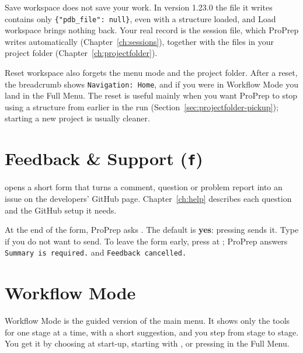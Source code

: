 \begin{watchout}
\textsf{Save workspace} does not save your work. In version 1.23.0 the file it
writes contains only \texttt{\{"pdb\_file": null\}}, even with a structure
loaded, and \textsf{Load workspace} brings nothing back. Your real record is the
session file, which ProPrep writes automatically (Chapter~\ref{ch:sessions}),
together with the files in your project folder (Chapter~\ref{ch:projectfolder}).
\end{watchout}

\begin{watchout}
\textsf{Reset workspace} also forgets the menu mode and the project folder. After
a reset, the breadcrumb shows \texttt{Navigation: Home}, and if you were in
Workflow Mode you land in the Full Menu. The reset is useful mainly when you want
ProPrep to stop using a structure from earlier in the run
(Section~\ref{sec:projectfolder-pickup}); starting a new project is usually
cleaner.
\end{watchout}

\section{Feedback \& Support (\texttt{f})}\label{sec:menus-feedback}

 opens a short form that turns a comment, question or problem report into
an issue on the developers' GitHub page. Chapter~\ref{ch:help} describes each
question and the GitHub setup it needs.

\begin{watchout}
At the end of the form, ProPrep asks
. The default is
\textbf{yes}: pressing  sends it. Type  if you do not want to
send. To leave the form early, press  at ; ProPrep
answers \texttt{Summary is required.} and \texttt{Feedback cancelled.}
\end{watchout}

\section{Workflow Mode}\label{sec:menus-workflow}

Workflow Mode is the guided version of the main menu. It shows only the tools
for one stage at a time, with a short suggestion, and you step from stage to
stage. You get it by choosing  at start-up, starting with
, or pressing  in the Full Menu.

